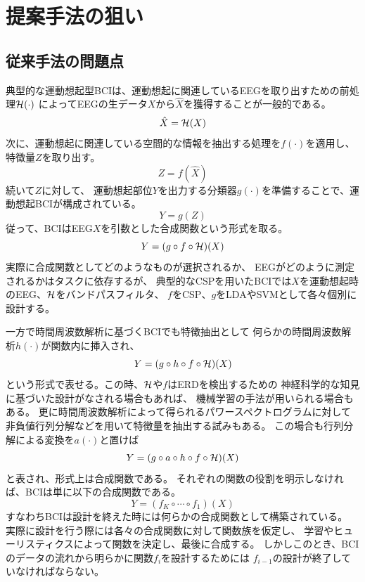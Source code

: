 

\section{\mc 提案手法の狙い}

\subsection{従来手法の問題点}
典型的な運動想起型BCIは、運動想起に関連しているEEGを取り出すための前処理\(\cal H(\cdot)\)
によってEEGの生データ\(X\)から\(\hat X\)を獲得することが一般的である。
\begin{equation}
    \hat X = {\cal H}(X)
    \label{eq:bandpass}
\end{equation}
次に、運動想起に関連している空間的な情報を抽出する処理を\(f(\cdot)\)を適用し、
特徴量\(Z\)を取り出す。
\begin{equation}
    Z = f(\hat X)
    \label{eq:spatfilter}
\end{equation}
続いて\(Z\)に対して、
運動想起部位\(Y\)を出力する分類器\(g(\cdot)\)を準備することで、運動想起BCIが構成されている。
\begin{equation}
    Y = g(Z)
    \label{eq:classifier}
\end{equation}
従って、BCIはEEG\(X\)を引数とした合成関数という形式を取る。
\begin{equation}
    Y = (g\circ f \circ {\cal H})(X)
    \label{eq:bci_gosei}
\end{equation}
実際に合成関数としてどのようなものが選択されるか、
EEGがどのように測定されるかはタスクに依存するが、
典型的なCSPを用いたBCIでは\(X\)を運動想起時のEEG、\(\cal H\)をバンドパスフィルタ、
\(f\)をCSP、\(g\)をLDAやSVMとして各々個別に設計する。

一方で時間周波数解析に基づくBCIでも特徴抽出として
何らかの時間周波数解析\(h(\cdot)\)が関数内に挿入され、
\begin{equation}
    Y = (g\circ h \circ f \circ {\cal H})(X)
    \label{eq:bci_gosei2}
\end{equation}
という形式で表せる。この時、\(\cal H\)や\(f\)はERDを検出するための
神経科学的な知見に基づいた設計がなされる場合もあれば、
機械学習の手法が用いられる場合もある。
更に時間周波数解析によって得られるパワースペクトログラムに対して
非負値行列分解などを用いて特徴量を抽出する試みもある\cite{kNMF,kNMF2}。
この場合も行列分解による変換を\(a(\cdot)\)と置けば
\begin{equation}
    Y = (g\circ a\circ h\circ f\circ {\cal H})(X)
    \label{eq:bci_gosei3}
\end{equation}
と表され、形式上は合成関数である。
それぞれの関数の役割を明示しなければ、BCIは単に以下の合成関数である。
\begin{equation}
    Y = (f_K\circ \cdots \circ f_1)(X)
    \label{eq:bci_gosei4}
\end{equation}
すなわちBCIは設計を終えた時には何らかの合成関数として構築されている。
実際に設計を行う際には各々の合成関数に対して関数族を仮定し、
学習やヒューリスティクスによって関数を決定し、最後に合成する。
しかしこのとき、BCIのデータの流れから明らかに関数\(f_i\)を設計するためには
\(f_{i-1}\)の設計が終了していなければならない。


